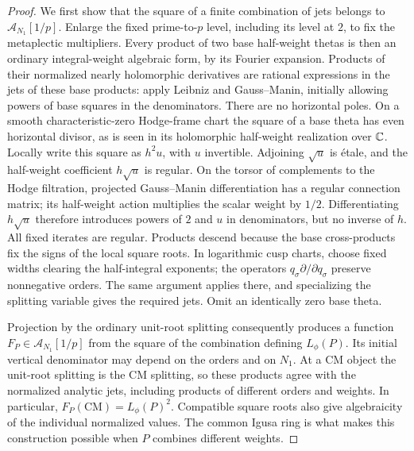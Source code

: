 \begin{proof}
 We first show that the square of a finite combination of jets belongs
 to $\mathcal A_{N_1}[1/p]$.  Enlarge the fixed prime-to-$p$
 level, including its level at $2$, to fix the metaplectic multipliers.
 Every product of two base half-weight thetas is then an ordinary
 integral-weight algebraic form, by its Fourier expansion.  Products
 of their normalized nearly holomorphic derivatives are rational
 expressions in the jets of these base products: apply Leibniz and
 Gauss--Manin, initially allowing powers of base squares in the
 denominators.  There are no horizontal poles.  On a smooth
 characteristic-zero Hodge-frame chart the square of a base theta has
 even horizontal divisor, as is seen in its holomorphic half-weight
 realization over $\mathbb C$.  Locally write this square as $h^2u$, with
 $u$ invertible.  Adjoining $\sqrt u$ is \'etale, and the half-weight
 coefficient $h\sqrt u$ is regular.  On the torsor of complements to
 the Hodge filtration, projected Gauss--Manin differentiation has a
 regular connection matrix; its half-weight action multiplies the
 scalar weight by $1/2$.  Differentiating $h\sqrt u$ therefore
 introduces powers of $2$ and $u$ in denominators, but no inverse of
 $h$.  All fixed iterates are regular.  Products descend because the
 base cross-products fix the signs of the local square roots.
 In logarithmic cusp charts, choose fixed widths clearing the
 half-integral exponents; the operators $q_\sigma\partial/\partial
 q_\sigma$ preserve nonnegative orders.  The same argument applies
 there, and specializing the splitting variable gives the required
 jets.  Omit an identically zero base theta.

 Projection by the ordinary unit-root splitting consequently produces
 a function $F_P\in\mathcal A_{N_1}[1/p]$ from the square of the
 combination defining $L_\phi(P)$.  Its initial vertical denominator
 may depend on the orders and on $N_1$.  At a CM object the unit-root
 splitting is the CM splitting, so these products agree with the normalized analytic jets,
 including products of different orders and weights.  In particular,
 $F_P(\mathrm{CM})=L_\phi(P)^2$.  Compatible square roots also give
 algebraicity of the individual normalized values.  The common Igusa
 ring is what makes this construction possible when $P$ combines
 different weights.


\end{proof}
